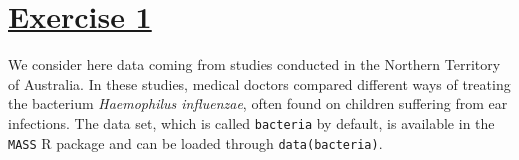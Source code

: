 \documentclass[a4paper,12pt]{article}\usepackage[]{graphicx}\usepackage[]{color}
\begin{document}

\begin{center}
\bigskip

\bigskip

\bigskip

\bigskip

\bigskip

\bigskip


\bigskip

\bigskip

\bigskip
\end{center}




\setlength{\parskip}{1ex plus 0.5ex minus 0.2ex}
\parindent=0cm
\setlength{\parskip}{1ex plus 0.5ex minus 0.2ex}
\linespread{1.1}
\sloppy


\section{\underline{Exercise 1}}

We consider here data coming from studies conducted in the Northern Territory of Australia. In these studies, medical doctors compared different ways of treating the bacterium \emph{Haemophilus influenzae}, often found on children suffering from ear infections. The data set, which is called \texttt{bacteria} by default, is available in the \texttt{MASS} R package and can be loaded through \verb"data(bacteria)".
\end{document}
